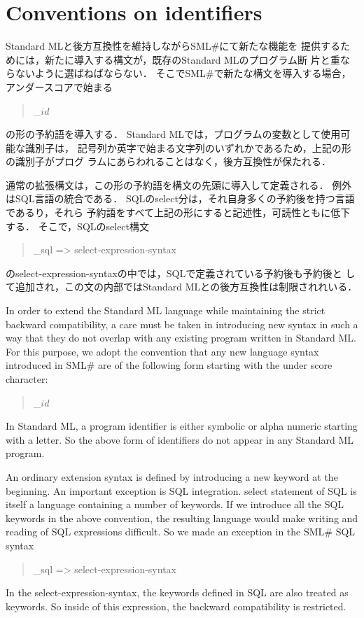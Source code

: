 \documentclass{jbook}
\newif\ifjp
\newcommand{\txt}[2]{#2}
\newcommand{\smlsharp}{SML\#}
\newenvironment{program}{\begin{quote}\begin{tt}}%
                        {\end{tt}\end{quote}}
\begin{document}
\section{\txt{識別名に関する約束}{Conventions on identifiers}}
\ifjp%
	Standard MLと後方互換性を維持しながら\smlsharp{}にて新たな機能を
提供するためには，新たに導入する構文が，既存のStandard MLのプログラム断
片と重ならないように選ばねばならない．
	そこで\smlsharp{}で新たな構文を導入する場合，アンダースコアで始まる
\begin{program}
\_$id$ 
\end{program}
の形の予約語を導入する．
	Standard MLでは，プログラムの変数として使用可能な識別子は，
記号列か英字で始まる文字列のいずれかであるため，上記の形の識別子がプログ
ラムにあらわれることはなく，後方互換性が保たれる．

	通常の拡張構文は，この形の予約語を構文の先頭に導入して定義される．
	例外はSQL言語の統合である．
	SQLのselect分は，それ自身多くの予約後を持つ言語であるり，それら
予約語をすべて上記の形にすると記述性，可読性ともに低下する．
	そこで，SQLのselect構文
\begin{program}
\_sql => {\rm select-expression-syntax}
\end{program}
のselect-expression-syntaxの中では，SQLで定義されている予約後も予約後と
して追加され，この文の内部ではStandard MLとの後方互換性は制限されれいる．

\else%
	In order to extend the Standard ML language while maintaining
the strict backward compatibility, a care must be taken in introducing
new syntax in such a way that they do not overlap with any existing
program written in Standard ML.
	For this purpose, we adopt the convention that any new language
syntax introduced in \smlsharp{} are of the following form starting with
the under score character:
\begin{program}
\_$id$ 
\end{program}
	In Standard ML, a program identifier is either symbolic or alpha
numeric starting with a letter.
	So the above form of identifiers do not appear in any Standard
ML program.

	An ordinary extension syntax is defined by introducing a new
keyword at the beginning.
	An important exception is SQL integration.
	select statement of SQL is itself a language containing a number
of keywords.
	If we introduce all the SQL keywords in the above convention,
the resulting language would make writing and reading of SQL expressions
difficult.
	So we made an exception in the \smlsharp{} SQL syntax
\begin{program}
\_sql => {\rm select-expression-syntax}
\end{program}
	In the select-expression-syntax, the keywords defined in SQL
are also treated as keywords.
	So inside of this expression, the backward compatibility is
restricted.
\end{document}

